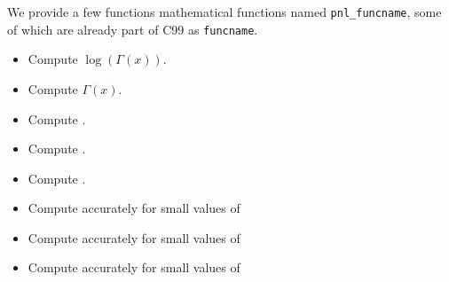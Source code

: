We provide a few functions mathematical functions named \verb+pnl_funcname+,
some of which are already part of C99 as \verb+funcname+.
\begin{itemize}
  \item {}
    \sshortdescribe Compute $\log(\Gamma(x))$.
  \item {}
    \sshortdescribe Compute $\Gamma(x)$.
  \item {}
    \sshortdescribe Compute .
  \item {}
    \sshortdescribe Compute .
  \item {}
    \sshortdescribe Compute .
  \item {}
    \sshortdescribe Compute  accurately for small values of 
  \item {}
    \sshortdescribe Compute  accurately for small values of 
  \item {}
    \sshortdescribe Compute  accurately for small values of 
\end{itemize}

